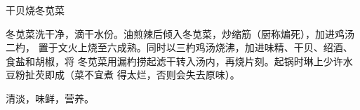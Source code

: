 \begin{recipe}{干贝烧冬苋菜}

\ingredients


\preparation

冬苋菜洗干净，滴干水份。油煎辣后倾入冬苋菜，炒缩筋（厨称煸死），加进鸡汤二杓，
置于文火上烧至六成熟。同时以三杓鸡汤烧沸，加进味精、干贝、绍酒、食盐和胡椒，将
冬苋菜用漏杓捞起滤干转入汤内，再烧片刻。起锅时琳上少许水豆粉扯芡即成（菜不宜煮
得太烂，否则会失去原味）。

\features

清淡，味鲜，营养。

\end{recipe}

